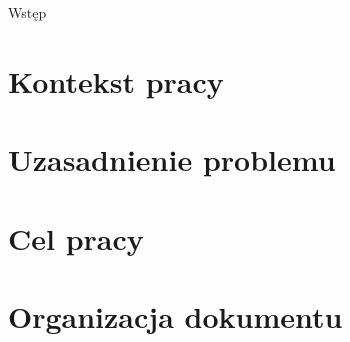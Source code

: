 \begin{chapter}{Wstęp}
	\newcommand{\chapterPath}{chapters/Introduction}

	\section{Kontekst pracy}
	\section{Uzasadnienie problemu}
	\section{Cel pracy}
	\section{Organizacja dokumentu}
\end{chapter}
